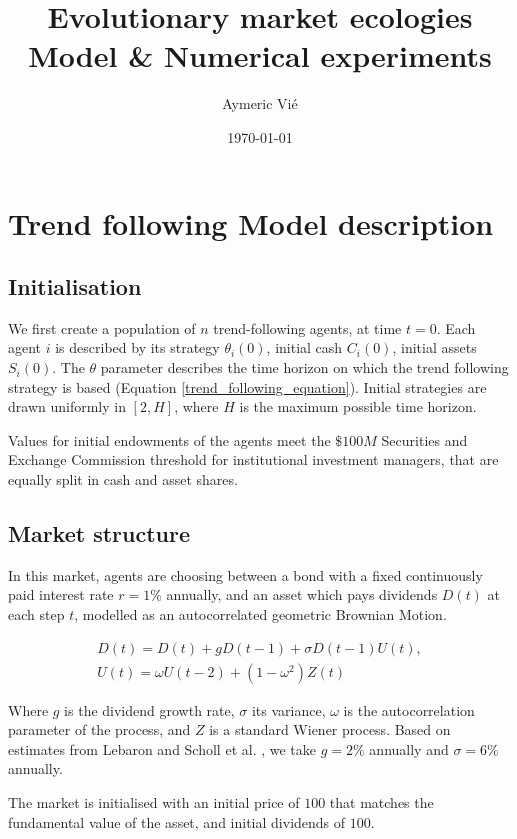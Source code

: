 \documentclass{article}
\title{Evolutionary market ecologies \\ Model \& Numerical experiments}
\author{Aymeric Vi\'{e}}
\date{\today}
\begin{document}
\maketitle

\tableofcontents

\clearpage

\section{Trend following Model description}

\subsection{Initialisation}

We first create a population of $n$ trend-following agents, at time $t=0$. Each agent $i$ is described by its strategy $\theta_i(0)$, initial cash $C_i(0)$, initial assets $S_i(0)$. The $\theta$ parameter describes the time horizon on which the trend following strategy is based (Equation \ref{trend_following_equation}). Initial strategies are drawn uniformly in $[2,H]$, where $H$ is the maximum possible time horizon. \par
Values for initial endowments of the agents meet the $\$100M$ Securities and Exchange Commission threshold for institutional investment managers, that are equally split in cash and asset shares. 

\subsection{Market structure}

In this market, agents are choosing between a bond with a fixed continuously paid interest rate $r = 1\%$ annually, and an asset which pays dividends $D(t)$ at each step $t$, modelled as an autocorrelated geometric Brownian Motion.

\begin{equation}
    \label{dividend_equation}
    \begin{array}{l}
{D}(t)={D}(t)+g {D}(t-1)+\sigma {D}(t-1) {U}(t), \\
{U}(t)=\omega U(t-2)+\left(1-\omega^{2}\right){Z}(t)
\end{array}
\end{equation}

Where $g$ is the dividend growth rate, $\sigma$ its variance, $\omega$ is the autocorrelation parameter of the process, and $Z$ is a standard Wiener process. Based on estimates from Lebaron \cite{lebaron2001empirical} and Scholl et al. \cite{scholl2020market}, we take $g=2\%$ annually and $\sigma = 6\%$ annually. \par
The market is initialised with an initial price of $100$ that matches the fundamental value of the asset, and initial dividends of $100$. 
\end{document}
